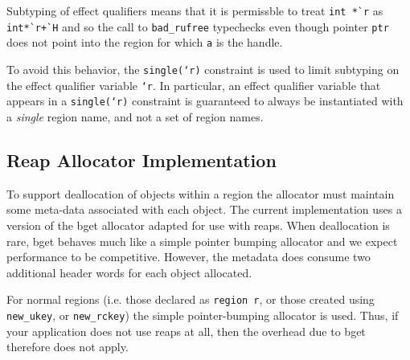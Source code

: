 Subtyping of effect qualifiers means that it is permissble to treat
\verb+int *`r+ as \verb^int*`r+`H^ and so the call to
\verb+bad_rufree+ typechecks even though pointer \texttt{ptr} does not
point into the region for which \texttt{a} is the handle.

To avoid this behavior, the \texttt{single(`r)} constraint is used to
limit subtyping on the effect qualifier variable \texttt{`r}. In
particular, an effect qualifier variable that appears in a
\texttt{single(`r)} constraint is guaranteed to always be instantiated
with a \emph{single} region name, and not a set of region names. 

\subsection{Reap Allocator Implementation}
\label{sec:bget}
To support deallocation of objects within a region the allocator must
maintain some meta-data associated with each object. The current
implementation uses a version of the bget allocator adapted for use
with reaps. When deallocation is rare, bget behaves much like a
simple pointer bumping allocator and we expect performance to be
competitive. However, the metadata does consume two additional header
words for each object allocated.

For normal regions (i.e. those declared as \texttt{region r}, or those
created using \texttt{new\_ukey}, or \texttt{new\_rckey}) the simple
pointer-bumping allocator is used. Thus, if your application does not
use reaps at all, then the overhead due to bget therefore does not
apply.
